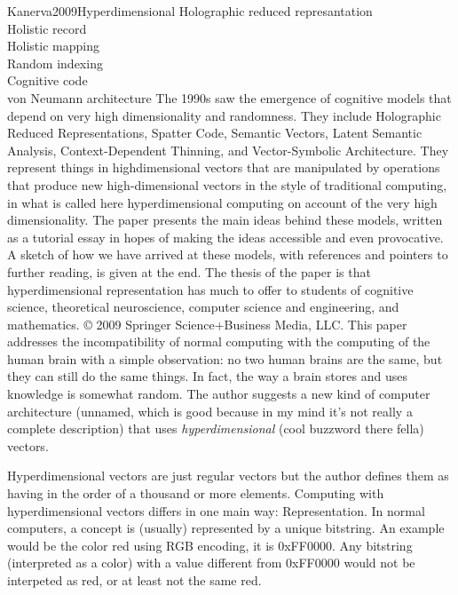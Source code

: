 \documentclass[10pt]{article}
\begin{document}
\begin{review}{Kanerva2009Hyperdimensional}
                {Holographic reduced represantation\\
                 Holistic record\\
                 Holistic mapping\\
                 Random indexing\\
                 Cognitive code\\
                 von Neumann architecture}
                {
                    The 1990s saw the emergence of cognitive models that depend on very high dimensionality and randomness. They include Holographic Reduced Representations, Spatter Code, Semantic Vectors, Latent Semantic Analysis, Context-Dependent Thinning, and Vector-Symbolic Architecture. They represent things in highdimensional vectors that are manipulated by operations that produce new high-dimensional vectors in the style of traditional computing, in what is called here hyperdimensional computing on account of the very high dimensionality. The paper presents the main ideas behind these models, written as a tutorial essay in hopes of making the ideas accessible and even provocative. A sketch of how we have arrived at these models, with references and pointers to further reading, is given at the end. The thesis of the paper is that hyperdimensional representation has much to offer to students of cognitive science, theoretical neuroscience, computer science and engineering, and mathematics. © 2009 Springer Science+Business Media, LLC.
                }
    This paper addresses the incompatibility of normal computing with the computing of the human brain with a simple observation: no two human brains are the same, but they can still do the same things.
    In fact, the way a brain stores and uses knowledge is somewhat random.
    The author suggests a new kind of computer architecture (unnamed, which is good because in my mind it's not really a complete description) that uses \emph{hyperdimensional} (cool buzzword there fella) vectors.
    
    Hyperdimensional vectors are just regular vectors but the author defines them as having in the order of a thousand or more elements.
    Computing with hyperdimensional vectors differs in one main way: Representation.
    In normal computers, a concept is (usually) represented by a unique bitstring.
    An example would be the color red using RGB encoding, it is 0xFF0000.
    Any bitstring (interpreted as a color) with a value different from 0xFF0000 would not be interpeted as red, or at least not the same red.
    

\end{review}
\end{document}

